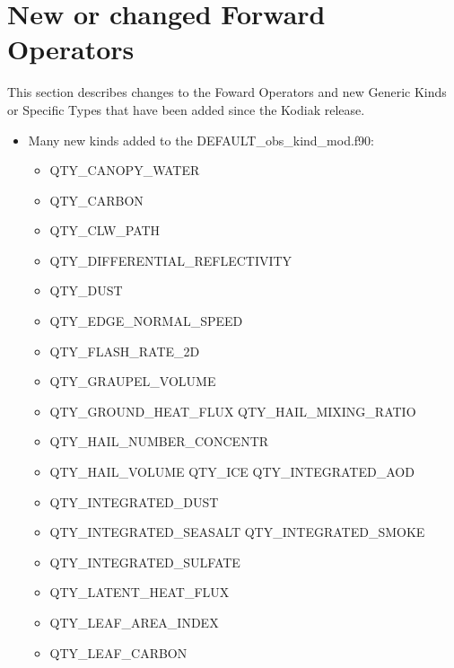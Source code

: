 \documentclass[letterpaper,10pt,english]{sphinxmanual}
\begin{document}
\section{New or changed Forward Operators}
\label{docs/Lanai_diffs_from_Kodiak:new-or-changed-forward-operators}
This section describes changes to the Foward Operators and new Generic
Kinds or Specific Types that have been added since the Kodiak release.
\begin{itemize}
\item {} 
Many new kinds added to the DEFAULT\_obs\_kind\_mod.f90:
\begin{itemize}
\item {} 
QTY\_CANOPY\_WATER

\item {} 
QTY\_CARBON

\item {} 
QTY\_CLW\_PATH

\item {} 
QTY\_DIFFERENTIAL\_REFLECTIVITY

\item {} 
QTY\_DUST

\item {} 
QTY\_EDGE\_NORMAL\_SPEED

\item {} 
QTY\_FLASH\_RATE\_2D

\item {} 
QTY\_GRAUPEL\_VOLUME

\item {} 
QTY\_GROUND\_HEAT\_FLUX QTY\_HAIL\_MIXING\_RATIO

\item {} 
QTY\_HAIL\_NUMBER\_CONCENTR

\item {} 
QTY\_HAIL\_VOLUME QTY\_ICE QTY\_INTEGRATED\_AOD

\item {} 
QTY\_INTEGRATED\_DUST

\item {} 
QTY\_INTEGRATED\_SEASALT QTY\_INTEGRATED\_SMOKE

\item {} 
QTY\_INTEGRATED\_SULFATE

\item {} 
QTY\_LATENT\_HEAT\_FLUX

\item {} 
QTY\_LEAF\_AREA\_INDEX

\item {} 
QTY\_LEAF\_CARBON


\end{itemize}
\end{itemize}
\end{document}
